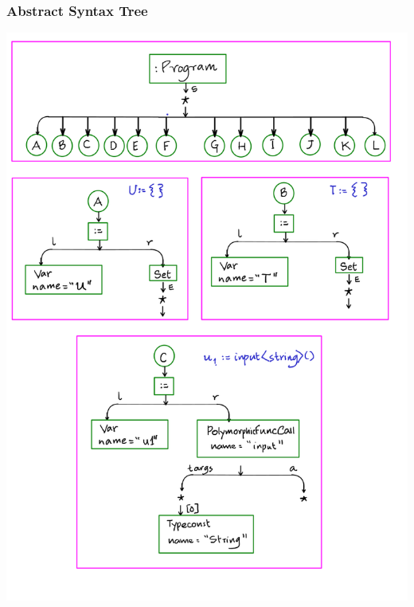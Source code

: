 \documentclass[12pts, a4paper]{article}
\begin{document}
\subsubsection{Abstract Syntax Tree}
\begin{center}
\includegraphics[width=\textwidth]{../images/ACT-AST-10.png}


\end{center}
\end{document}
